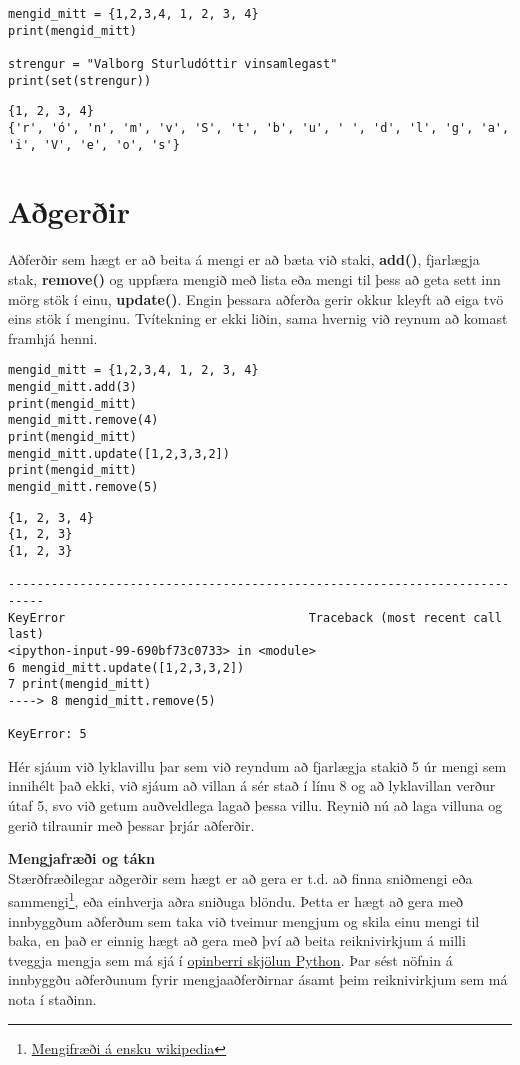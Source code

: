 \begin{lstlisting}[caption=Mengi skilgreind, label=lst:set-duplicate]
mengid_mitt = {1,2,3,4, 1, 2, 3, 4}
print(mengid_mitt) 

strengur = "Valborg Sturludóttir vinsamlegast"
print(set(strengur))
\end{lstlisting}
\lstset{style=uttak}
\begin{lstlisting}
{1, 2, 3, 4}
{'r', 'ó', 'n', 'm', 'v', 'S', 't', 'b', 'u', ' ', 'd', 'l', 'g', 'a', 'i', 'V', 'e', 'o', 's'}
\end{lstlisting}
\lstset{style=venjulegt}

\section{Aðgerðir}
Aðferðir sem hægt er að beita á mengi er að bæta við staki, \textbf{add()}, fjarlægja stak, \textbf{remove()} og uppfæra mengið með lista eða mengi til þess að geta sett inn mörg stök í einu, \textbf{update()}.
Engin þessara aðferða gerir okkur kleyft að eiga tvö eins stök í menginu.
Tvítekning er ekki liðin, sama hvernig við reynum að komast framhjá henni.

\begin{lstlisting}[caption=Mengja aðferðir, label=lst:set-method]
mengid_mitt = {1,2,3,4, 1, 2, 3, 4}
mengid_mitt.add(3)
print(mengid_mitt)
mengid_mitt.remove(4)
print(mengid_mitt)
mengid_mitt.update([1,2,3,3,2])
print(mengid_mitt)
mengid_mitt.remove(5)
\end{lstlisting}
\lstset{style=uttak}
\begin{lstlisting}
{1, 2, 3, 4}
{1, 2, 3}
{1, 2, 3}

---------------------------------------------------------------------------
KeyError                                  Traceback (most recent call last)
<ipython-input-99-690bf73c0733> in <module>
6 mengid_mitt.update([1,2,3,3,2])
7 print(mengid_mitt)
----> 8 mengid_mitt.remove(5)

KeyError: 5
\end{lstlisting}
\lstset{style=venjulegt}

Hér sjáum við lyklavillu þar sem við reyndum að fjarlægja stakið 5 úr mengi sem innihélt það ekki, við sjáum að villan á sér stað í línu 8 og að lyklavillan verður útaf 5, svo við getum auðveldlega lagað þessa villu.
Reynið nú að laga villuna og gerið tilraunir með þessar þrjár aðferðir.

\begin{itarefni}
\textbf{Mengjafræði og tákn}\\
Stærðfræðilegar aðgerðir sem hægt er að gera er t.d. að finna sniðmengi eða sammengi\footnote{\href{https://en.wikipedia.org/wiki/Set_(mathematics)}{Mengifræði á ensku wikipedia}}, eða einhverja aðra sniðuga blöndu. Þetta er hægt að gera með innbyggðum aðferðum sem taka við tveimur mengjum og skila einu mengi til baka, en það er einnig hægt að gera með því að beita reiknivirkjum á milli tveggja mengja sem má sjá í \href{https://docs.python.org/3/library/stdtypes.html#set}{opinberri skjölun Python}.
Þar sést nöfnin á innbyggðu aðferðunum fyrir mengjaaðferðirnar ásamt þeim reiknivirkjum sem má nota í staðinn.
\end{itarefni}

